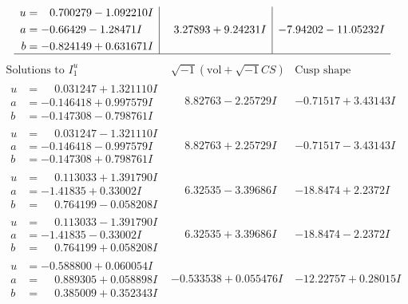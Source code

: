 \documentclass[1p]{elsarticle_modified}
\theoremstyle{definition}
\newcommand{\I}{\sqrt{-1}}
\begin{document}
$$\begin{array}{c|c|c}
\begin{aligned}
u &= \phantom{-}0.700279 - 1.092210 I \\
a &= -0.66429 - 1.28471 I \\
b &= -0.824149 + 0.631671 I\end{aligned}
 & \phantom{-}3.27893 + 9.24231 I & -7.94202 - 11.05232 I\\
 \hline 
 \end{array}$$\newpage$$\begin{array}{c|c|c}  
\text{Solutions to }I^u_{1}& \I (\text{vol} + \sqrt{-1}CS) & \text{Cusp shape}\\
 \hline 
\begin{aligned}
u &= \phantom{-}0.031247 + 1.321110 I \\
a &= -0.146418 + 0.997579 I \\
b &= -0.147308 - 0.798761 I\end{aligned}
 & \phantom{-}8.82763 - 2.25729 I & -0.71517 + 3.43143 I \\ \hline\begin{aligned}
u &= \phantom{-}0.031247 - 1.321110 I \\
a &= -0.146418 - 0.997579 I \\
b &= -0.147308 + 0.798761 I\end{aligned}
 & \phantom{-}8.82763 + 2.25729 I & -0.71517 - 3.43143 I \\ \hline\begin{aligned}
u &= \phantom{-}0.113033 + 1.391790 I \\
a &= -1.41835 + 0.33002 I \\
b &= \phantom{-}0.764199 - 0.058208 I\end{aligned}
 & \phantom{-}6.32535 - 3.39686 I & -18.8474 + 2.2372 I \\ \hline\begin{aligned}
u &= \phantom{-}0.113033 - 1.391790 I \\
a &= -1.41835 - 0.33002 I \\
b &= \phantom{-}0.764199 + 0.058208 I\end{aligned}
 & \phantom{-}6.32535 + 3.39686 I & -18.8474 - 2.2372 I \\ \hline\begin{aligned}
u &= -0.588800 + 0.060054 I \\
a &= \phantom{-}0.889305 + 0.058898 I \\
b &= \phantom{-}0.385009 + 0.352343 I\end{aligned}
 & -0.533538 + 0.055476 I & -12.22757 + 0.28015 I \\ \hline\begin{aligned}

\end{aligned}
\end{array}$$
\end{document}
